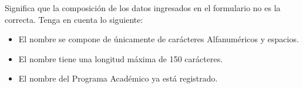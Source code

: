 \begin{itemize}
                    Significa que la composición de los datos ingresados en el formulario no es la correcta. Tenga en cuenta lo siguiente:

                    \begin{itemize}
                        \item El nombre se compone de únicamente de carácteres Alfanuméricos y espacios.

                        \item El nombre tiene una longitud máxima de 150 carácteres.
                        
                        \item El nombre del Programa Académico ya está registrado.
                    \end{itemize}

            \end{itemize}
